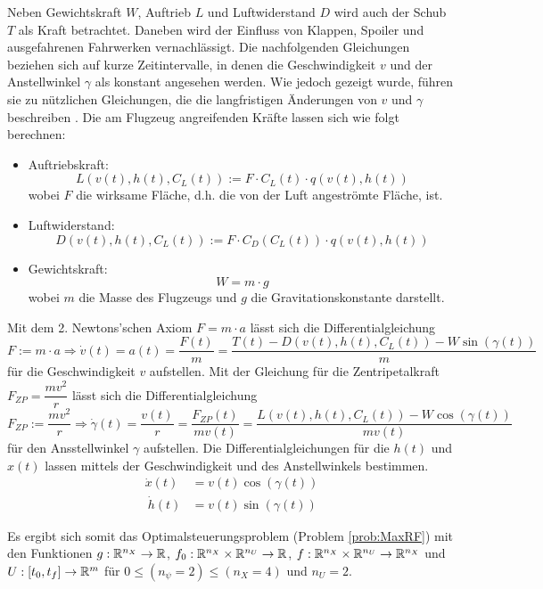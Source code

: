 Neben Gewichtskraft \(W\), Auftrieb \(L\) und Luftwiderstand \(D\) wird auch der Schub \(T\) als Kraft betrachtet. Daneben wird der Einfluss von Klappen, Spoiler und ausgefahrenen Fahrwerken vernachlässigt. Die nachfolgenden Gleichungen beziehen sich auf kurze Zeitintervalle, in denen die Geschwindigkeit $v$ und der Anstellwinkel $\gamma$ als konstant angesehen werden. Wie jedoch gezeigt wurde, führen sie zu nützlichen Gleichungen, die die langfristigen Änderungen von $v$ und $\gamma$ beschreiben \cite{Schaback2017}. Die am Flugzeug angreifenden Kräfte lassen sich wie folgt berechnen:
\begin{itemize}
    \item Auftriebskraft: \[L(v(t), h(t), C_L(t)) := F \cdot C_L(t) \cdot q(v(t), h(t))\] wobei $F$ die wirksame Fläche, d.h. die von der Luft angeströmte Fläche, ist.
    \item Luftwiderstand: \[D(v(t), h(t), C_L(t)) := F \cdot C_D(C_L(t)) \cdot q(v(t), h(t))\]
    \item Gewichtskraft: \[W = m \cdot g\] wobei $m$ die Masse des Flugzeugs und $g$ die Gravitationskonstante darstellt.
\end{itemize}

Mit dem 2. Newtons'schen Axiom $F = m \cdot a$ lässt sich die Differentialgleichung
\[F := m \cdot a \Rightarrow \dot{v}(t) = a(t) = \dfrac{F(t)}{m} = \dfrac{T(t) - D(v(t),h(t),C_L(t)) - W \sin(\gamma(t))}{m}\]
für die Geschwindigkeit $v$ aufstellen.
Mit der Gleichung für die Zentripetalkraft $F_{ZP} = \dfrac{m v^2}{r}$ lässt sich die Differentialgleichung
\[F_{ZP} := \dfrac{m v^2}{r} \Rightarrow \dot{\gamma}(t) = \dfrac{v(t)}{r} = \dfrac{F_{ZP}(t)}{m v(t)} = \dfrac{L(v(t),h(t),C_L(t)) - W \cos(\gamma(t))}{m v(t)}\]
für den Ansstellwinkel $\gamma$ aufstellen.
Die Differentialgleichungen für die $h(t)$ und $x(t)$ lassen mittels der Geschwindigkeit und des Anstellwinkels bestimmen.
\[\begin{split}
    \dot{x}(t) &= v(t) \cos(\gamma(t))\\\
    \dot{h}(t) &= v(t) \sin(\gamma(t))
\end{split} \]

Es ergibt sich somit das Optimalsteuerungsproblem (Problem \ref{prob:MaxRF}) mit den Funktionen $g : \mathbb{R}^{n_X} \to \mathbb{R}$, $f_0 : \mathbb{R}^{n_X} \times \mathbb{R}^{n_U} \to \mathbb{R}$, $f : \mathbb{R}^{n_X} \times \mathbb{R}^{n_U} \to \mathbb{R}^{n_X}$ und $U : [t_0,t_f] \to \mathbb{R}^m$ für $0 \leq (n_{\psi} = 2) \leq (n_X = 4)$ und $n_U = 2$.

